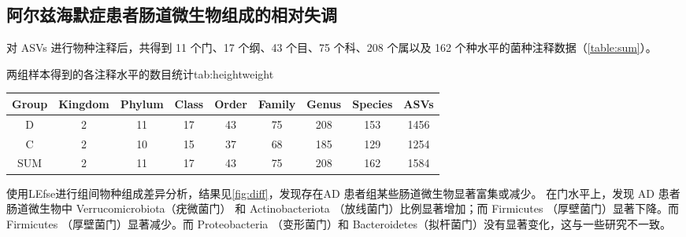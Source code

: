 \documentclass[supercite]{HustGraduPaper}
\begin{document}
\subsection{阿尔兹海默症患者肠道微生物组成的相对失调}
对 ASVs 进行物种注释后，共得到 11 个门、17 个纲、43 个目、75 个科、208 个属以及 162 个种水平的菌种注释数据（\autoref{table:sum}）。
\begin{generaltab}{两组样本得到的各注释水平的数目统计}{tab:heightweight}
	\begin{tabular}{c|c|c|c|c|c|c|c|c}
		\toprule
		Group & Kingdom & Phylum & Class & Order & Family & Genus & Species & ASVs\\
		\midrule
		D & 2 & 11 & 17 & 43 & 75 & 208 & 153 & 1456 \\ 
        C & 2 & 10 & 15 & 37 & 68 & 185 & 129 & 1254 \\ 
        SUM & 2 & 11 & 17 & 43 & 75 & 208 & 162 & 1584 \\     
		\bottomrule
		
	\end{tabular}
	\label{table:sum}
\end{generaltab}
使用LEfse进行组间物种组成差异分析，结果见\autoref{fig:diff}，发现存在AD 患者组某些肠道微生物显著富集或减少。
在门水平上，发现 AD 患者肠道微生物中 Verrucomicrobiota（疣微菌门） 和 Actinobacteriota （放线菌门）比例显著增加；而 Firmicutes （厚壁菌门）显著下降。而 Firmicutes （厚壁菌门）显著减少。而 Proteobacteria （变形菌门）和 Bacteroidetes（拟杆菌门）没有显著变化，这与一些研究不一致\cite{zhuang22018gut}\cite{liu2019altered}。
\end{document}
